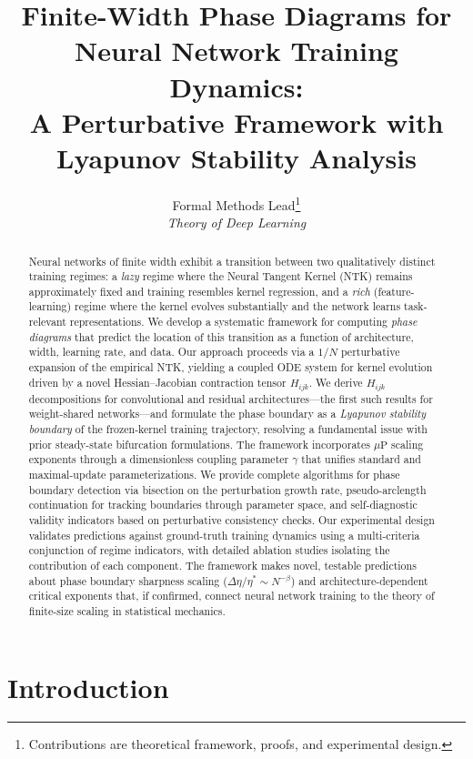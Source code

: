 \documentclass[11pt]{article}
\title{Finite-Width Phase Diagrams for Neural Network Training Dynamics:\\
A Perturbative Framework with Lyapunov Stability Analysis}
\author{
  Formal Methods Lead\thanks{Contributions are theoretical framework, proofs, and experimental design.} \\
  \textit{Theory of Deep Learning}
}
\date{}
\theoremstyle{definition}
\newcommand{\muP}{\mu\text{P}}
\begin{document}
\maketitle

\begin{abstract}
Neural networks of finite width exhibit a transition between two qualitatively distinct training regimes: a \emph{lazy} regime where the Neural Tangent Kernel (NTK) remains approximately fixed and training resembles kernel regression, and a \emph{rich} (feature-learning) regime where the kernel evolves substantially and the network learns task-relevant representations. We develop a systematic framework for computing \emph{phase diagrams} that predict the location of this transition as a function of architecture, width, learning rate, and data. Our approach proceeds via a $1/N$ perturbative expansion of the empirical NTK, yielding a coupled ODE system for kernel evolution driven by a novel Hessian--Jacobian contraction tensor $H_{ijk}$. We derive $H_{ijk}$ decompositions for convolutional and residual architectures---the first such results for weight-shared networks---and formulate the phase boundary as a \emph{Lyapunov stability boundary} of the frozen-kernel training trajectory, resolving a fundamental issue with prior steady-state bifurcation formulations. The framework incorporates $\muP$ scaling exponents through a dimensionless coupling parameter $\gamma$ that unifies standard and maximal-update parameterizations. We provide complete algorithms for phase boundary detection via bisection on the perturbation growth rate, pseudo-arclength continuation for tracking boundaries through parameter space, and self-diagnostic validity indicators based on perturbative consistency checks. Our experimental design validates predictions against ground-truth training dynamics using a multi-criteria conjunction of regime indicators, with detailed ablation studies isolating the contribution of each component. The framework makes novel, testable predictions about phase boundary sharpness scaling ($\Delta\eta/\eta^* \sim N^{-\beta}$) and architecture-dependent critical exponents that, if confirmed, connect neural network training to the theory of finite-size scaling in statistical mechanics.
\end{abstract}

\section{Introduction}
\label{sec:intro}
\end{document}

